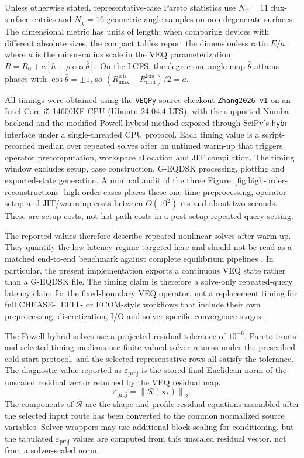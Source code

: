 \documentclass[final, 3p, times]{elsarticle}
\begin{document}
Unless otherwise stated, representative-case Pareto statistics use $N_\psi=11$ flux-surface entries and $N_\chi=16$ geometric-angle samples on non-degenerate surfaces. The dimensional metric has units of length; when comparing devices with different absolute sizes, the compact tables report the dimensionless ratio $E/a$, where $a$ is the minor-radius scale in the VEQ parameterization $R=R_0+a[h+\rho\cos\bar{\theta}]$. On the LCFS, the degree-one angle map $\bar{\theta}$ attains phases with $\cos\bar{\theta}=\pm1$, so $(R_{\max}^{\mathrm{lcfs}}-R_{\min}^{\mathrm{lcfs}})/2=a$.

All timings were obtained using the \texttt{VEQPy} source checkout \texttt{Zhang2026-v1} on an Intel Core i5-14600KF CPU (Ubuntu 24.04.4 LTS), with the supported Numba backend and the modified Powell hybrid method exposed through SciPy's \texttt{hybr} interface under a single-threaded CPU protocol. Each timing value is a script-recorded median over repeated solves after an untimed warm-up that triggers operator precomputation, workspace allocation and JIT compilation. The timing window excludes setup, case construction, G-EQDSK processing, plotting and exported-state generation. A minimal audit of the three Figure~\ref{fig:high-order-reconstructions} high-order cases places these one-time preprocessing, operator-setup and JIT/warm-up costs between $O(10^2)$ ms and about two seconds. These are setup costs, not hot-path costs in a post-setup repeated-query setting.

The reported values therefore describe repeated nonlinear solves after warm-up. They quantify the low-latency regime targeted here and should not be read as a matched end-to-end benchmark against complete equilibrium pipelines \cite{Lutjens1996,Lee2015}. In particular, the present implementation exports a continuous VEQ state rather than a G-EQDSK file. The timing claim is therefore a solve-only repeated-query latency claim for the fixed-boundary VEQ operator, not a replacement timing for full CHEASE-, EFIT- or ECOM-style workflows that include their own preprocessing, discretization, I/O and solver-specific convergence stages.

The Powell-hybrid solves use a projected-residual tolerance of $10^{-6}$. Pareto fronts and selected timing medians use finite-valued solver returns under the prescribed cold-start protocol, and the selected representative rows all satisfy the tolerance. The diagnostic value reported as $\varepsilon_{\mathrm{proj}}$ is the stored final Euclidean norm of the unscaled residual vector returned by the VEQ residual map,
\begin{equation}
    \varepsilon_{\mathrm{proj}}
    =\left\|\mathcal{R}(\mathbf{x}_*)\right\|_2 .
    \label{eq:projected-residual-norm}
\end{equation}
The components of $\mathcal{R}$ are the shape and profile residual equations assembled after the selected input route has been converted to the common normalized source variables. Solver wrappers may use additional block scaling for conditioning, but the tabulated $\varepsilon_{\mathrm{proj}}$ values are computed from this unscaled residual vector, not from a solver-scaled norm.
\end{document}
